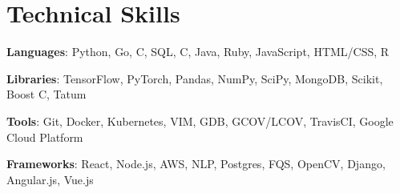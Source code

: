 \documentclass[letterpaper,11pt]{article}
\renewcommand\small{\normalsize}
\def\CC{{C\nolinebreak[4]\hspace{-.05em}\raisebox{.4ex}{\tiny\bf ++}}}
\begin{document}
\section{Technical Skills}
 \begin{itemize}[leftmargin=10.8pt, label={}]
    \small{\item{
     \textbf{Languages}{: \hspace{1.5mm} Python, Go, \CC, SQL, C, Java, Ruby, JavaScript, HTML/CSS, R} \\
     }}
     \vspace{0pt}
      \small{\item{
     \textbf{Libraries}{:\hspace{6.2mm} TensorFlow, PyTorch, Pandas, NumPy, SciPy, MongoDB, Scikit, Boost \CC, Tatum} \\
     }}\vspace{0pt}
      \small{\item{
     \textbf{Tools}{:\hspace{13mm} Git, Docker, Kubernetes, VIM, GDB, GCOV/LCOV, TravisCI, Google Cloud Platform} \\
     }}\vspace{0pt}
      \small{\item{
     \textbf{Frameworks}{: React, Node.js, AWS, NLP, Postgres, FQS, OpenCV, Django, Angular.js, Vue.js} \\
    }}
 \end{itemize}

\end{document}

